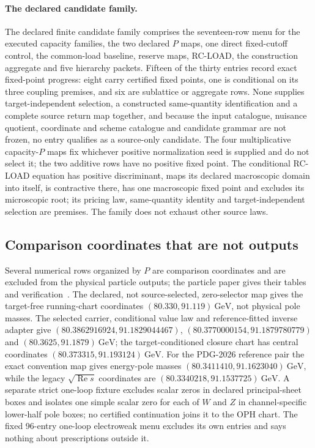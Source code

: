 \paragraph{The declared candidate family.}
The declared finite candidate family comprises the seventeen-row menu for the
executed capacity families, the two declared \(P\) maps, one direct
fixed-cutoff control, the common-load baseline, reserve maps, RC-LOAD, the
construction aggregate and five hierarchy packets. Fifteen of the thirty
entries record exact fixed-point progress: eight carry certified fixed points,
one is conditional on its three coupling premises, and six are sublattice or
aggregate rows. None supplies target-independent selection, a constructed
same-quantity identification and a complete source return map together, and
because the input catalogue, nuisance quotient, coordinate and scheme
catalogue and candidate grammar are not frozen, no entry qualifies as a
source-only candidate. The four multiplicative capacity-\(P\) maps fix
whichever positive normalization seed is supplied and do not select it; the
two additive rows have no positive fixed point. The conditional RC-LOAD
equation has positive discriminant, maps its declared macroscopic domain into
itself, is contractive there, has one macroscopic fixed point and excludes
its microscopic root; its pricing law, same-quantity identity and
target-independent selection are premises. The family does not exhaust other
source laws.

\subsection{Comparison coordinates that are not outputs}
\label{sec:closure-comparison-coordinates}

Several numerical rows organized by \(P\) are comparison coordinates and are
excluded from the physical particle outputs; the particle paper gives their
tables and verification~\cite{ophparticles}. The declared, not
source-selected, zero-selector map gives the target-free running-chart
coordinates \((80.330,91.119)~\mathrm{GeV}\), not physical pole masses. The
selected carrier, conditional value law and reference-fitted inverse adapter
give \((80.3862916924,91.1829044467)\), \((80.3770000154,91.1879780779)\) and
\((80.3625,91.1879)~\mathrm{GeV}\); the target-conditioned closure chart has
central coordinates \((80.373315,91.193124)~\mathrm{GeV}\). For the PDG-2026
reference pair the exact convention map gives energy-pole masses
\((80.3411410,91.1623040)~\mathrm{GeV}\), while the legacy
\(\sqrt{\operatorname{Re}s}\) coordinates are
\((80.3340218,91.1537725)~\mathrm{GeV}\). A separate strict one-loop fixture
excludes scalar zeros in declared principal-sheet boxes and isolates one
simple scalar zero for each of \(W\) and \(Z\) in channel-specific lower-half
pole boxes; no certified continuation joins it to the OPH chart. The fixed
96-entry one-loop electroweak menu excludes its own entries and says nothing
about prescriptions outside it.

